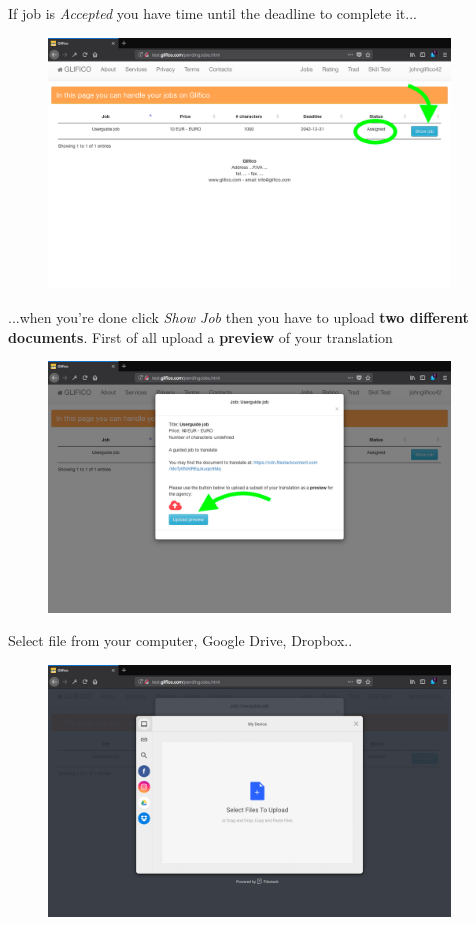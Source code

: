 \documentclass[11 pt, a4paper]{article}
\begin{document}
\clearpage
If job is \textit{Accepted} you have time until the deadline to complete it...
\begin{figure}[H]
\centering
\includegraphics[width=0.95\textwidth]{translator_job4.png}
\end{figure}

...when you're done click \textit{Show Job} then you have to upload \textbf{two different documents}.
First of all upload a \textbf{preview} of your translation
\begin{figure}[H]
\centering
\includegraphics[width=0.95\textwidth]{translator_job5.png}
\end{figure}


\clearpage
Select file from your computer, Google Drive, Dropbox..
\begin{figure}[H]
\centering
\includegraphics[width=0.95\textwidth]{translator_job6.png}
\end{figure}
\end{document}
